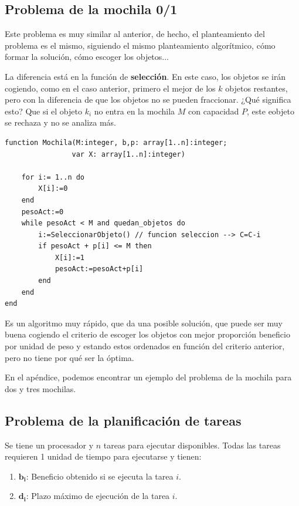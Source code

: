\documentclass[10pt,a4paper,spanish]{report}
\theoremstyle{definition}
\theoremstyle{remark}
\begin{document}
\subsection{\textcolor{electriccrimson}Problema de la mochila 0/1}

Este problema es muy similar al anterior, de hecho, el planteamiento del problema es el mismo, siguiendo el mismo planteamiento algorítmico, cómo formar la solución, cómo escoger los objetos...

La diferencia está en la función de \textbf{\textcolor{electriccrimson}{selección}}. En este caso, los objetos se irán cogiendo, como en el caso anterior, primero el mejor de los $k$ objetos restantes, pero con la diferencia de que los objetos no se pueden fraccionar. ¿Qué significa esto? Que si el objeto $k_i$ no entra en la mochila $M$ con capacidad $P$, este eobjeto se rechaza y no se analiza más. 

\begin{verbatim}
function Mochila(M:integer, b,p: array[1..n]:integer;
                var X: array[1..n]:integer)

    for i:= 1..n do
        X[i]:=0
    end
    pesoAct:=0
    while pesoAct < M and quedan_objetos do
        i:=SeleccionarObjeto() // funcion seleccion --> C=C-i
        if pesoAct + p[i] <= M then
            X[i]:=1
            pesoAct:=pesoAct+p[i]
        end
    end
end
\end{verbatim}

Es un algoritmo muy rápido, que da una posible solución, que puede ser muy buena cogiendo el criterio de escoger los objetos con mejor proporción beneficio por unidad de peso y estando estos ordenados en función del criterio anterior, pero no tiene por qué ser la óptima.

En el apéndice, podemos encontrar un ejemplo del problema de la mochila para dos y tres mochilas.

\subsection{\textcolor{electriccrimson}Problema de la planificación de tareas}

Se tiene un procesador y $n$ tareas para ejecutar disponibles. Todas las tareas requieren 1 unidad de tiempo para ejecutarse y tienen:
\begin{enumerate}[---]
    \item $\mathbf{b_i}$: Beneficio obtenido si se ejecuta la tarea $i$.
    \item $\mathbf{d_i}$: Plazo máximo de ejecución de la tarea $i$.
\end{enumerate}
\end{document}
